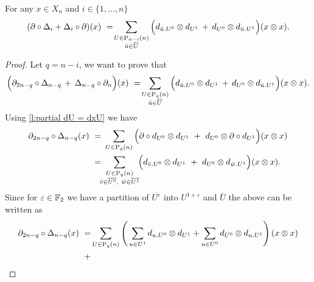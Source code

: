 \begin{lemma} \label{l:boundary of Delta}
	For any $x \in X_n$ and $i \in \{1, \dots, n\}$
	\begin{equation} \label{e:boundary of Delta}
	(\partial \circ \Delta_i + \Delta_i \circ \partial)(x) \ = \!
	\sum_{\substack{U \in \mathrm{P}_{n-i}(n) \\ {\bar{u}} \in \overline{U}}} \Big( d_{{\bar{u}}.U^0} \otimes d_{U^1} \, + \, d_{U^0} \otimes d_{{\bar{u}}.U^1} \Big) (x \otimes x).
	\end{equation}
\end{lemma}

\begin{proof}
	Let $q = n-i$, we want to prove that
	\begin{equation*}
	\Big( \partial_{2n-q} \circ \Delta_{n - q} \, +\, \Delta_{n-q} \circ \partial_n \Big) (x) \ = \!
	\sum_{\substack{U \in \mathrm{P}_{q}(n) \\ {\bar{u}} \in \overline{U}}} \Big( d_{{\bar{u}}.U^0} \otimes d_{U^1} \, + \, d_{U^0} \otimes d_{{\bar{u}}.U^1} \Big) (x \otimes x).
	\end{equation*}
	Using \cref{l:partial dU = dxU} we have
	\begin{equation*}
	\begin{split}
	\partial_{2n-q} \circ \Delta_{n - q} (x) \ = & \
	\sum_{U \in \mathrm{P}_q(n)} \Big( \partial \circ d_{U^0} \otimes d_{U^1}\ +\
	d_{U^0} \otimes \partial \circ d_{U^1} \Big) (x \otimes x) \\ = & \!\!
	\sum_{\substack{U \in \mathrm{P}_q(n) \\ \bar v \in \overline{U^0},\ \bar w \in \overline{U^1} } }\!\! \Big( d_{\bar v.U^0} \otimes d_{U^1}\ +\ d_{U^0} \otimes d_{\bar w.U^1}\Big) (x \otimes x).
	\end{split}
	\end{equation*}
	Since for $\varepsilon \in {\mathbb{F}_2}$ we have a partition of $\overline{U^\varepsilon}$ into $U^{1+\varepsilon}$ and $\overline{U}$ the above can be written as
	\begin{align*}
	\partial_{2n-q} \circ \Delta_{n - q} (x) \ = &
	\sum_{U \in \P_q(n)} \left( \,
	\sum_{u \in U^1} d_{u.U^0} \ot d_{U^1} +
	\sum_{u \in U^0} d_{U^0} \ot d_{u.U^1} \right)(x \ot x) \\ + &

\end{align*}
\end{proof}
